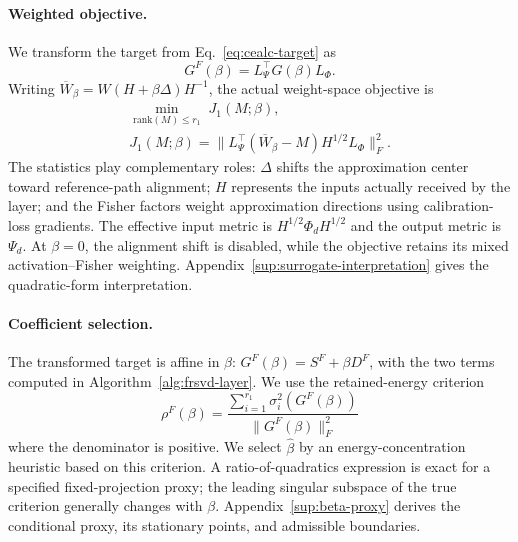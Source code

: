 \documentclass[11pt]{article}
\begin{document}
\paragraph{Weighted objective.}
We transform the target from Eq.~\eqref{eq:cealc-target} as
\begin{equation}
G^F(\beta)=L_\Psi^\top G(\beta)L_\Phi.
\label{eq:fisher-target}
\end{equation}
Writing $\overline W_\beta=W(H+\beta\Delta)H^{-1}$, the actual weight-space objective is
\begin{equation}
\begin{aligned}
\min_{\mathrm{rank}(M)\le r_1}\;J_1(M;\beta),\\
J_1(M;\beta)=\|L_\Psi^\top(\overline W_\beta-M)
H^{1/2}L_\Phi\|_F^2.
\end{aligned}
\label{eq:stage1-objective}
\end{equation}
The statistics play complementary roles: $\Delta$ shifts the approximation center toward reference-path alignment; $H$ represents the inputs actually received by the layer; and the Fisher factors weight approximation directions using calibration-loss gradients. The effective input metric is $H^{1/2}\Phi_dH^{1/2}$ and the output metric is $\Psi_d$. At $\beta=0$, the alignment shift is disabled, while the objective retains its mixed activation--Fisher weighting. Appendix~\ref{sup:surrogate-interpretation} gives the quadratic-form interpretation.

\paragraph{Coefficient selection.}
The transformed target is affine in $\beta$: $G^F(\beta)=S^F+\beta D^F$, with the two terms computed in Algorithm~\ref{alg:frsvd-layer}. We use the retained-energy criterion
\begin{equation}
\rho^F(\beta)=
\frac{\sum_{i=1}^{r_1}\sigma_i^2(G^F(\beta))}
{\|G^F(\beta)\|_F^2}
\label{eq:fisher-rer}
\end{equation}
where the denominator is positive. We select $\widehat\beta$ by an energy-concentration heuristic based on this criterion. A ratio-of-quadratics expression is exact for a specified fixed-projection proxy; the leading singular subspace of the true criterion generally changes with $\beta$. Appendix~\ref{sup:beta-proxy} derives the conditional proxy, its stationary points, and admissible boundaries.
\end{document}
